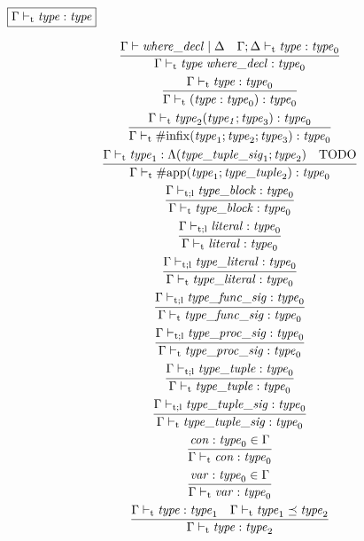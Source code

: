 $\fbox{$\Gamma \vdash_\mathrm{t} \mathit{type}: \mathit{type}$}$

\begin{gather*}
    \infer{\Gamma \vdash_\mathrm{t} \mathit{type}\; \mathit{where\_decl}: \mathit{type}_0}{
        \Gamma \vdash \mathit{where\_decl} \mid \Delta
        &
        \Gamma; \Delta \vdash_\mathrm{t} \mathit{type}: \mathit{type}_0
    }
    \\
    \infer{\Gamma \vdash_\mathrm{t} (\mathit{type}: \mathit{type}_0): \mathit{type}_0}{
        \Gamma \vdash_\mathrm{t} \mathit{type}: \mathit{type}_0
    }
    \\
    \infer{\Gamma \vdash_\mathrm{t} \mathrm{\#infix}(\mathit{type}_1; \mathit{type}_2; \mathit{type}_3): \mathit{type}_0}{
        \Gamma \vdash_\mathrm{t} \mathit{type}_2(\mathit{type_1}; \mathit{type}_3): \mathit{type}_0
    }
    \\
    \infer{\Gamma \vdash_\mathrm{t} \mathrm{\#app}(\mathit{type}_1; \mathit{type\_tuple}_2): \mathit{type}_0}{
        \Gamma \vdash_\mathrm{t} \mathit{type}_1: \Lambda(\mathit{type\_tuple\_sig}_1; \mathit{type}_2)
        &
        \text{TODO}
    }
    \\
    \infer{\Gamma \vdash_\mathrm{t} \mathit{type\_block}: \mathit{type}_0}{
        \Gamma \vdash_{\mathrm{t}; \mathrm{l}} \mathit{type\_block}: \mathit{type}_0
    }
    \\
    \infer{\Gamma \vdash_\mathrm{t} \mathit{literal}: \mathit{type}_0}{
        \Gamma \vdash_{\mathrm{t}; \mathrm{l}} \mathit{literal}: \mathit{type}_0
    }
    \\
    \infer{\Gamma \vdash_\mathrm{t} \mathit{type\_literal}: \mathit{type}_0}{
        \Gamma \vdash_{\mathrm{t}; \mathrm{l}} \mathit{type\_literal}: \mathit{type}_0
    }
    \\
    \infer{\Gamma \vdash_\mathrm{t} \mathit{type\_func\_sig}: \mathit{type}_0}{
        \Gamma \vdash_{\mathrm{t}; \mathrm{l}} \mathit{type\_func\_sig}: \mathit{type}_0
    }
    \\
    \infer{\Gamma \vdash_\mathrm{t} \mathit{type\_proc\_sig}: \mathit{type}_0}{
        \Gamma \vdash_{\mathrm{t}; \mathrm{l}} \mathit{type\_proc\_sig}: \mathit{type}_0
    }
    \\
    \infer{\Gamma \vdash_\mathrm{t} \mathit{type\_tuple}: \mathit{type}_0}{
        \Gamma \vdash_{\mathrm{t}; \mathrm{l}} \mathit{type\_tuple}: \mathit{type}_0
    }
    \\
    \infer{\Gamma \vdash_\mathrm{t} \mathit{type\_tuple\_sig}: \mathit{type}_0}{
        \Gamma \vdash_{\mathrm{t}; \mathrm{l}} \mathit{type\_tuple\_sig}: \mathit{type}_0
    }
    \\
    \infer{\Gamma \vdash_\mathrm{t} \mathit{con}: \mathit{type}_0}{
        \mathit{con}: \mathit{type}_0 \in \Gamma
    }
    \\
    \infer{\Gamma \vdash_\mathrm{t} \mathit{var}: \mathit{type}_0}{
        \mathit{var}: \mathit{type}_0 \in \Gamma
    }
    \\
    \infer{\Gamma \vdash_\mathrm{t} \mathit{type}: \mathit{type}_2}{
        \Gamma \vdash_\mathrm{t} \mathit{type}: \mathit{type}_1
        &
        \Gamma \vdash_\mathrm{t} \mathit{type}_1 \preceq \mathit{type}_2
    }
\end{gather*}

